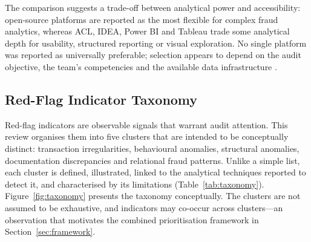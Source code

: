 \documentclass[conference]{IEEEtran}
\begin{document}
The comparison suggests a trade-off between analytical power and accessibility: open-source platforms are reported as the most flexible for complex fraud analytics, whereas ACL, IDEA, Power BI and Tableau trade some analytical depth for usability, structured reporting or visual exploration. No single platform was reported as universally preferable; selection appears to depend on the audit objective, the team's competencies and the available data infrastructure \cite{b12}.

\subsection{Red-Flag Indicator Taxonomy}
\label{sec:taxonomy}

Red-flag indicators are observable signals that warrant audit attention. This review organises them into five clusters that are intended to be conceptually distinct: transaction irregularities, behavioural anomalies, structural anomalies, documentation discrepancies and relational fraud patterns. Unlike a simple list, each cluster is defined, illustrated, linked to the analytical techniques reported to detect it, and characterised by its limitations (Table~\ref{tab:taxonomy}). Figure~\ref{fig:taxonomy} presents the taxonomy conceptually. The clusters are not assumed to be exhaustive, and indicators may co-occur across clusters---an observation that motivates the combined prioritisation framework in Section~\ref{sec:framework}.
\end{document}
